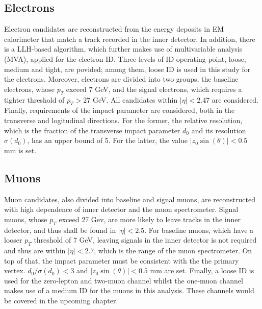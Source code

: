 \documentclass[class=NCU_thesis, crop=false]{standalone}
\begin{document}
	\subsection{Electrons}
		Electron candidates are reconstructed from the energy deposits in EM calorimeter that match a track recorded in the inner detector. In addition, there is a LLH-based algorithm, which further makes use of multivariable analysis (MVA), applied for the electron ID. Three levels of ID operating point, loose, medium and tight, are povided; among them, loose ID is used in this study for the electrons. Moreover, electrons are divided into two groups, the baseline electrons, whose $p_T$ exceed 7 GeV, and the signal electrons, which requires a tighter threshold of $p_T > 27$ GeV. All candidates within $\lvert \eta \rvert < 2.47$ are considered. Finally, requirements of the impact parameter are considered, both in the transverse and logitudinal directions. For the former, the relative resolution, which is the fraction of the transverse impact parameter $d_0$ and its resolution $\sigma(d_0)$, has an upper bound of 5. For the latter, the value $\lvert z_0 \sin(\theta) \rvert < 0.5$ mm is set.
		
	\subsection{Muons}
		Muon candidates, also divided into baseline and signal muons, are reconstructed with high dependence of inner detector and the muon spectrometer. Signal muons, whose $p_T$ exceed 27 Gev, are more likely to leave tracks in the inner detector, and thus shall be found in $\lvert \eta \rvert < 2.5$. For baseline muons, which have a looser $p_T$ threshold of 7 GeV, leaving signals in the inner detector is not required and thus are within $\lvert \eta \rvert < 2.7$, which is the range of the muon spectrometer. On top of that, the impact parameter must be consistent with the the primary vertex. $d_0 / \sigma(d_0) < 3$ and $\lvert z_0 \sin(\theta) \rvert < 0.5$ mm are set. Finally, a loose ID is used for the zero-lepton and two-muon channel whilst the one-muon channel makes use of a medium ID for the muons in this analysis. These channels would be covered in the upcoming chapter.
		
\end{document}
